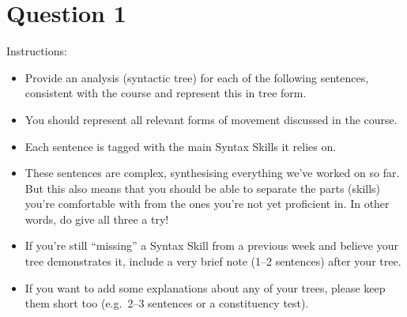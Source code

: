 \documentclass{article}
\begin{document}

\section*{Question 1}%

Instructions:
\begin{itemize}
    \item Provide an analysis (syntactic tree) for each of the following sentences, consistent with the course and represent this in tree form.
    \item You should represent all relevant forms of movement discussed in the course.
    \item Each sentence is tagged with the main Syntax Skills it relies on.
    \item These sentences are complex, synthesising everything we've worked on so far. But this also means that you should be able to separate the parts (skills) you're comfortable with from the ones you're not yet proficient in. In other words, do give all three a try!
    \item If you're still ``missing'' a Syntax Skill from a previous week and believe your tree demonstrates it, include a very brief note (1--2 sentences) after your tree.
    \item If you want to add some explanations about any of your trees, please keep them short too (e.g.~2--3 sentences or a constituency test).
\end{itemize}
\end{document}
